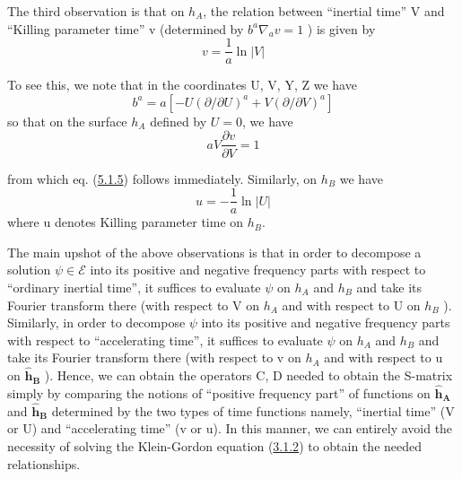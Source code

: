 \documentclass[11pt,a4paper]{article}
\begin{document}
The third observation is that on \(h_A\), the relation between ``inertial time'' V and ``Killing parameter time'' v (determined by \(b^a\nabla_a v = 1\) ) is given by
\begin{equation*}
v = \frac{1}{a} \ln |V| \tag{5.1.5}\label{eq:5.1.5}
\end{equation*}

To see this, we note that in the coordinates U, V, Y, Z we have
\begin{equation*}
b^{a} = a[-U(\partial/\partial U)^{a} + V(\partial/\partial V)^{a}] \tag{5.1.6}\label{eq:5.1.6}
\end{equation*}
so that on the surface \(h_A\) defined by \(U=0\), we have
\begin{equation*}
aV\frac{\partial v}{\partial V}=1 \tag{5.1.7}\label{eq:5.1.7}
\end{equation*}

from which eq. (\hyperref[eq:5.1.5]{5.1.5}) follows immediately. Similarly, on \(h_B\) we have
\begin{equation*}
u=-\frac1a\ln\lvert U\rvert \tag{5.1.8}\label{eq:5.1.8}
\end{equation*}
where u denotes Killing parameter time on \(h_B\).

The main upshot of the above observations is that in order to decompose a solution \(\psi \in \mathcal{E}\) into its positive and negative frequency parts with respect to ``ordinary inertial time'', it suffices to evaluate \(\psi\) on \(h_A\) and \(h_B\) and take its Fourier transform there (with respect to V on \(h_A\) and with respect to U on \(h_B\) ). Similarly, in order to decompose \(\psi\) into its positive and negative frequency parts with respect to ``accelerating time'', it suffices to evaluate \(\psi\) on \(h_A\) and \(h_B\) and take its Fourier transform there (with respect to v on \(h_A\) and \hypertarget{source-124}{} with respect to u on \(\mathbf{\hat{h}_B}\) ). Hence, we can obtain the operators C, D needed to obtain the S-matrix simply by comparing the notions of ``positive frequency part'' of functions on \(\mathbf{\hat{h}_A}\) and \(\mathbf{\hat{h}_B}\) determined by the two types of time functions namely, ``inertial time'' (V or U) and ``accelerating time'' (v or u). In this manner, we can entirely avoid the necessity of solving the Klein-Gordon equation (\hyperref[eq:3.1.2]{3.1.2}) to obtain the needed relationships.
\end{document}

